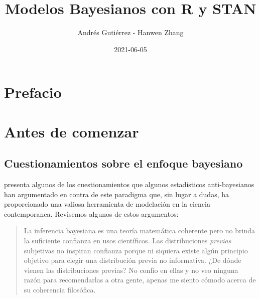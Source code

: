 \documentclass[
  spanish,
]{book}
\title{Modelos Bayesianos con R y STAN}
\author{Andrés Gutiérrez - Hanwen Zhang}
\date{2021-06-05}
\theoremstyle{definition}
\theoremstyle{definition}
\theoremstyle{definition}
\theoremstyle{definition}
\theoremstyle{remark}
\begin{document}
\maketitle

{
\hypersetup{linkcolor=}
\setcounter{tocdepth}{1}
\tableofcontents
}
\hypertarget{prefacio}{%
\chapter*{Prefacio}\label{prefacio}}

\hypertarget{antes-de-comenzar}{%
\chapter*{Antes de comenzar}\label{antes-de-comenzar}}

\hypertarget{cuestionamientos-sobre-el-enfoque-bayesiano}{%
\section*{Cuestionamientos sobre el enfoque bayesiano}\label{cuestionamientos-sobre-el-enfoque-bayesiano}}

\citet{GelmanObjections} presenta algunos de los cuestionamientos que algunos estadísticos anti-bayesianos han argumentado en contra de este paradigma que, sin lugar a dudas, ha proporcionado una valiosa herramienta de modelación en la ciencia contemporanea. Revisemos algunos de estos argumentos:

\begin{quote}
La inferencia bayesiana es una teoría matemática coherente pero no brinda la suficiente confianza en usos científicos. Las distribuciones \emph{previas} subjetivas no inspiran confianza porque ni siquiera existe algún principio objetivo para elegir una distribución previa no informativa. ¿De dónde vienen las distribuciones previas? No confío en ellas y no veo ninguna razón para recomendarlas a otra gente, apenas me siento cómodo acerca de su coherencia filosófica.
\end{quote}
\end{document}
